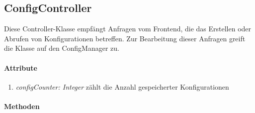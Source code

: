 \subsection{ConfigController}
Diese Controller-Klasse empfängt Anfragen vom Frontend, die das Erstellen oder Abrufen von Konfigurationen betreffen. Zur Bearbeitung dieser Anfragen greift die Klasse auf den ConfigManager zu.


\paragraph{Attribute}
\begin{enumerate}[$\bullet$]
	\item \textit{configCounter: Integer} zählt die Anzahl gespeicherter Konfigurationen
\end{enumerate}

\paragraph{Methoden}

